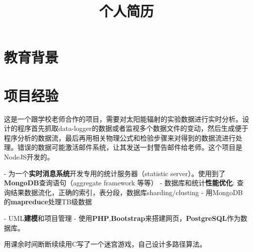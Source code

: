 \documentclass[11pt,a4paper]{moderncv}
\title{\normalsize 个人简历}
\begin{document}
\maketitle

\section{教育背景}


\section{项目经验}

{
这是一个跟学校老师合作的项目，需要对太阳能辐射的实验数据进行实时分析。设计的程序首先抓取data-logger的数据或者监视多个数据文件的变动，然后生成便于程序分析的数据流，最后再用相关物理公式和检验步骤来对得到的数据流进行处理。错误的数据可能激活邮件系统，让其发送一封警告邮件给老师。这个项目是NodeJS开发的。
}

\vspace*{0.2\baselineskip}
{
- 为一个\textbf{实时消息系统}开发专用的统计服务器（statistic server）。使用到了\textbf{MongoDB}查询语句（aggregate framework 等等）\newline
- 数据库和统计\textbf{性能优化}: 查询结果数据流化，正确的索引，表分段，数据库sharding/clusting\newline
- 用MongoDB的\textbf{mapreduce}处理TB级数据
}

\vspace*{0.2\baselineskip}
{
- UML\textbf{建模}和项目管理\newline
- 使用\textbf{PHP},\textbf{Bootstrap}来搭建网页，\textbf{PostgreSQL}作为数据库。
}

\vspace*{0.2\baselineskip}
{用课余时间断断续续用C写了一个迷宫游戏，自己设计多路径算法。}
\end{document}
